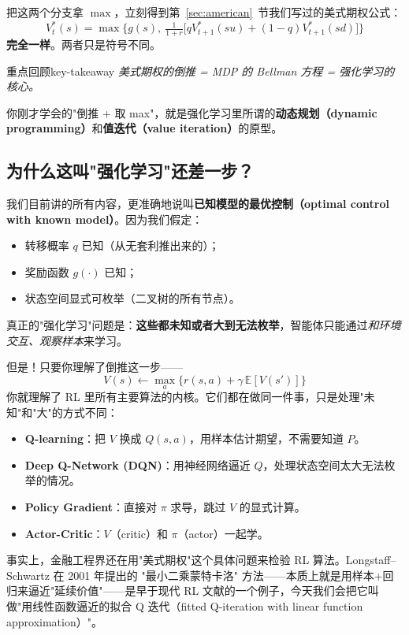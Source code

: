 \documentclass[11pt,a4paper]{ctexart}
\newcommand{\E}{\mathbb{E}}
\newcommand{\1}{\mathbf{1}}
\begin{document}
把这两个分支拿 $\max$，立刻得到第~\ref{sec:american}~节我们写过的美式期权公式：
\[
V^*_t(s) = \max\Big\{g(s),\ \tfrac{1}{1+r}\bigl[q V^*_{t+1}(su) + (1-q) V^*_{t+1}(sd)\bigr]\Big\}
\]
\textbf{完全一样}。两者只是符号不同。

\begin{idea}{重点回顾}{key-takeaway}
\itshape\large
美式期权的倒推 = MDP 的 Bellman 方程 = 强化学习的核心。

\smallskip
你刚才学会的"倒推 + 取 max"，就是强化学习里所谓的\textbf{动态规划（dynamic programming）}和\textbf{值迭代（value iteration）}的原型。
\end{idea}

\subsection{为什么这叫"强化学习"还差一步？}

我们目前讲的所有内容，更准确地说叫\textbf{已知模型的最优控制（optimal control with known model）}。因为我们假定：
\begin{itemize}
    \item 转移概率 $q$ 已知（从无套利推出来的）；
    \item 奖励函数 $g(\cdot)$ 已知；
    \item 状态空间显式可枚举（二叉树的所有节点）。
\end{itemize}
真正的"强化学习"问题是：\textbf{这些都未知或者大到无法枚举}，智能体只能通过\emph{和环境交互、观察样本}来学习。

但是！只要你理解了倒推这一步——
\[
V(s) \leftarrow \max_a \Big\{r(s,a) + \gamma\, \E[V(s')]\Big\}
\]
你就理解了 RL 里所有主要算法的内核。它们都在做同一件事，只是处理"未知"和"大"的方式不同：

\begin{itemize}[leftmargin=*]
    \item \textbf{Q-learning}：把 $V$ 换成 $Q(s,a)$，用样本估计期望，不需要知道 $P$。
    \item \textbf{Deep Q-Network (DQN)}：用神经网络逼近 $Q$，处理状态空间太大无法枚举的情况。
    \item \textbf{Policy Gradient}：直接对 $\pi$ 求导，跳过 $V$ 的显式计算。
    \item \textbf{Actor-Critic}：$V$（critic）和 $\pi$（actor）一起学。
\end{itemize}

事实上，金融工程界还在用"美式期权"这个具体问题来检验 RL 算法。Longstaff–Schwartz 在 2001 年提出的 "最小二乘蒙特卡洛" 方法——本质上就是用样本+回归来逼近"延续价值"——是早于现代 RL 文献的一个例子，今天我们会把它叫做"用线性函数逼近的拟合 Q 迭代（fitted Q-iteration with linear function approximation）"。
\end{document}
